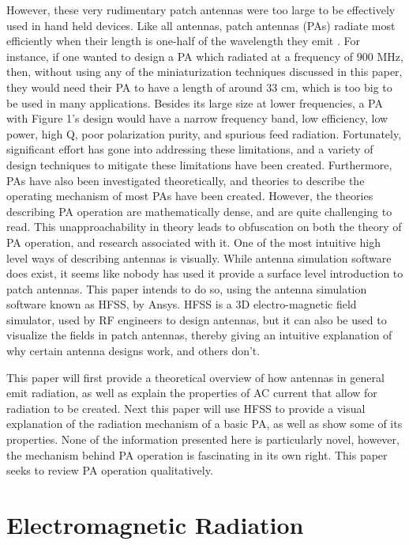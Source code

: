 \documentclass[12pt]{article}
\begin{document}
However, these very rudimentary patch antennas were too large to be effectively used in hand held devices. Like all antennas, patch antennas (PAs) radiate most efficiently when their length is one-half of the wavelength they emit \cite{khan2015microstrip}. For instance, if one wanted to design a PA which radiated at a frequency of $900$ MHz, then, without using any of the miniaturization techniques discussed in this paper, they would need their PA to have a length of around $33$ cm, which is too big to be used in many applications. Besides its large size at lower frequencies, a PA with Figure 1's design would have a narrow frequency band, low efficiency, low power, high Q, poor polarization purity, and spurious feed radiation\cite{balanis2016antenna}. Fortunately, significant effort has gone into addressing these limitations, and a variety of design techniques to mitigate these limitations have been created\cite{balanis2016antenna}. Furthermore, PAs have also been investigated theoretically, and theories to describe the operating mechanism of most PAs have been created. However, the theories describing PA operation are mathematically dense, and are quite challenging to read. This unapproachability in theory leads to obfuscation on both the theory of PA operation, and research associated with it. One of the most intuitive high level ways of describing antennas is visually. While antenna simulation software does exist, it seems like nobody has used it provide a surface level introduction to patch antennas. This paper intends to do so, using the antenna simulation software known as HFSS, by Ansys. HFSS is a 3D electro-magnetic field simulator, used by RF engineers to design antennas, but it can also be used to visualize the fields in patch antennas, thereby giving an intuitive explanation of why certain antenna designs work, and others don't.

This paper will first provide a theoretical overview of how antennas in general emit radiation, as well as explain the properties of AC current that allow for radiation to be created. Next this paper will use HFSS to provide a visual explanation of the radiation mechanism of a basic PA, as well as show some of its properties. None of the information presented here is particularly novel, however, the mechanism behind PA operation is fascinating in its own right. This paper seeks to review PA operation qualitatively.              
\section{Electromagnetic Radiation}  
\end{document}
